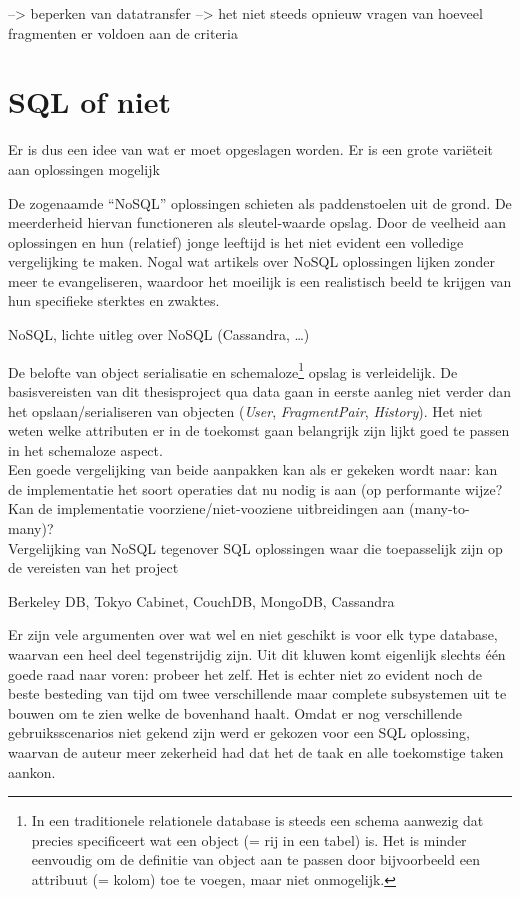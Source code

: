--> beperken van datatransfer
--> het niet steeds opnieuw vragen van hoeveel fragmenten er voldoen aan de criteria

\section{SQL of niet}
Er is dus een idee van wat er moet opgeslagen worden. Er is een grote vari\"eteit aan oplossingen mogelijk

De zogenaamde ``NoSQL'' oplossingen schieten als paddenstoelen uit de grond. De meerderheid hiervan functioneren als sleutel-waarde opslag. Door de veelheid aan oplossingen en hun (relatief) jonge leeftijd is het niet evident een volledige vergelijking te maken. Nogal wat artikels over NoSQL oplossingen lijken zonder meer te evangeliseren, waardoor het moeilijk is een realistisch beeld te krijgen van hun specifieke sterktes en zwaktes.

NoSQL, lichte uitleg over NoSQL (Cassandra, \ldots)

De belofte van object serialisatie en schemaloze\footnote{In een traditionele relationele database is steeds een schema aanwezig dat precies specificeert wat een object (= rij in een tabel) is. Het is minder eenvoudig om de definitie van object aan te passen door bijvoorbeeld een attribuut (= kolom) toe te voegen, maar niet onmogelijk.} opslag is verleidelijk. De basisvereisten van dit thesisproject qua data gaan in eerste aanleg niet verder dan het opslaan/serialiseren van objecten (\emph{User}, \emph{FragmentPair}, \emph{History}). Het niet weten welke attributen er in de toekomst gaan belangrijk zijn lijkt goed te passen in het schemaloze aspect.\\

Een goede vergelijking van beide aanpakken kan als er gekeken wordt naar: kan de implementatie het soort operaties dat nu nodig is aan (op performante wijze? Kan de implementatie voorziene/niet-vooziene uitbreidingen aan (many-to-many)?\\


Vergelijking van NoSQL tegenover SQL oplossingen waar die toepasselijk zijn op de vereisten van het project

Berkeley DB, Tokyo Cabinet, CouchDB, MongoDB, Cassandra

Er zijn vele argumenten over wat wel en niet geschikt is voor elk type database, waarvan een heel deel tegenstrijdig zijn. Uit dit kluwen komt eigenlijk slechts \'e\'en goede raad naar voren: probeer het zelf. Het is echter niet zo evident noch de beste besteding van tijd om twee verschillende maar complete subsystemen uit te bouwen om te zien welke de bovenhand haalt. Omdat er nog verschillende gebruiksscenarios niet gekend zijn werd er gekozen voor een SQL oplossing, waarvan de auteur meer zekerheid had dat het de taak en alle toekomstige taken aankon.

